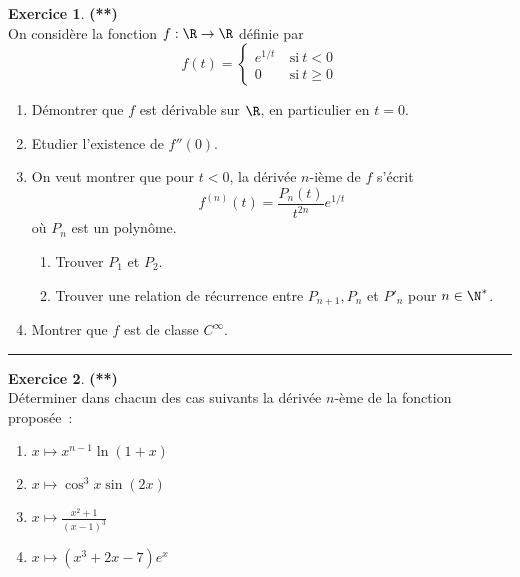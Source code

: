 \documentclass[a4paper,11pt]{article}
\theoremstyle{definition}
\newtheorem{exo}{Exercice} %
\begin{document}
\begin{minipage}{1\linewidth}
	\begin{minipage}[t]{0.48\linewidth}
		\raggedright
		
		

				
		\begin{exo}\textbf{(**)}\quad\\[0.2cm]
			On consid\`ere la fonction $f : \R \to \R$ d\'efinie par
			\begin{equation*}
			f(t) =
			\begin{cases}
			e^{1/t} & \mathrm{\ si\ } t<0\\
			0  & \mathrm{\ si\ } t \geq 0
			\end{cases}
			\end{equation*}
			
			\begin{enumerate}
				\item D\'emontrer  que $f$ est d\'erivable sur $\R$, en particulier en $t=0$.
				\item Etudier l'existence de $f''(0)$.
				\item On veut montrer que pour $t<0$, la d\'eriv\'ee $n$-i\`eme de $f$ s'\'ecrit
				$$f^{(n)}(t)=\frac{P_n(t)}{t^{2n}}e^{1/t}$$
				o\`u $P_n$ est un polyn\^ome.
				\begin{enumerate}
					\item Trouver $P_1$ et $P_2$.
					\item Trouver une relation de r\'ecurrence entre $P_{n+1}, P_n$ et $P'_n$ pour
					$n\in \N^*$.
				\end{enumerate}
				\item Montrer que $f$ est de classe $C^{\infty}$.
			\end{enumerate}
			\centering
			\rule{1\linewidth}{0.6pt}
		\end{exo}
		
		

		
		
		
	\end{minipage}	
	\hfill\vrule\hfill
	\begin{minipage}[t]{0.48\linewidth}
		\raggedright
		
				\begin{exo}\textbf{(**)}\quad\\[0.2cm]
			Déterminer dans chacun des cas suivants la dérivée $n$-ème de la fonction proposée~:
			\begin{multicols}{2}
				\begin{enumerate}
				\item $x\mapsto x^{n-1}\ln(1+x) $
				\item $x\mapsto\cos^3x\sin(2x) $
				\item $x\mapsto\frac{x^2+1}{(x-1)^3}$
				\item $x\mapsto(x^3+2x-7)e^x$
			\end{enumerate}
			\end{multicols}
	

\end{exo}
\end{minipage}
\end{minipage}
\end{document}
